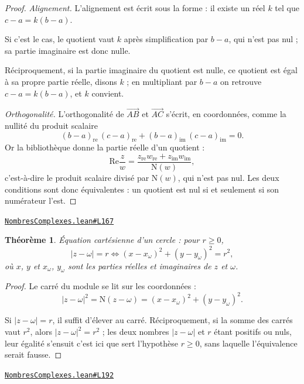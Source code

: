 \documentclass[11pt,a4paper]{article}
\theoremstyle{definition}
\theoremstyle{plain}
\newtheorem{theoreme}{Théorème}
\newcommand{\source}[2]{\par\smallskip\noindent\hfill{\footnotesize\href{#1}{\texttt{#2}}}\par\smallskip}
\begin{document}
\begin{proof}
\emph{Alignement.} L'alignement est écrit sous la forme : il existe un réel $k$ tel que
$c - a = k(b - a)$.

Si c'est le cas, le quotient vaut $k$ après simplification par $b - a$, qui n'est pas nul ;
sa partie imaginaire est donc nulle.

Réciproquement, si la partie imaginaire du quotient est nulle, ce quotient est égal à sa
propre partie réelle, disons $k$ ; en multipliant par $b - a$ on retrouve $c - a = k(b-a)$,
et $k$ convient.

\smallskip\noindent
\emph{Orthogonalité.} L'orthogonalité de $\overrightarrow{AB}$ et $\overrightarrow{AC}$
s'écrit, en coordonnées, comme la nullité du produit scalaire
\[ (b-a)_{\mathrm{re}}\,(c-a)_{\mathrm{re}} + (b-a)_{\mathrm{im}}\,(c-a)_{\mathrm{im}} = 0 . \]
Or la bibliothèque donne la partie réelle d'un quotient :
\[ \mathrm{Re}\frac{z}{w}
   = \frac{z_{\mathrm{re}} w_{\mathrm{re}} + z_{\mathrm{im}} w_{\mathrm{im}}}{\mathrm{N}(w)} , \]
c'est-à-dire le produit scalaire divisé par $\mathrm{N}(w)$, qui n'est pas nul. Les deux
conditions sont donc équivalentes : un quotient est nul si et seulement si son numérateur
l'est.
\end{proof}
\source{https://github.com/Commutator-IO/learn-lean/blob/main/courses/02-lycee/07-nombres-complexes/NombresComplexes.lean\#L167}{NombresComplexes.lean\#L167}

\begin{theoreme}
Équation cartésienne d'un cercle : pour $r \ge 0$,
\[ |z - \omega| = r \iff (x - x_\omega)^{2} + (y - y_\omega)^{2} = r^{2} , \]
où $x$, $y$ et $x_\omega$, $y_\omega$ sont les parties réelles et imaginaires de $z$ et
$\omega$.
\end{theoreme}

\begin{proof}
Le carré du module se lit sur les coordonnées :
\[ |z - \omega|^{2} = \mathrm{N}(z - \omega)
   = (x - x_\omega)^{2} + (y - y_\omega)^{2} . \]

Si $|z - \omega| = r$, il suffit d'élever au carré. Réciproquement, si la somme des carrés
vaut $r^{2}$, alors $|z-\omega|^{2} = r^{2}$ ; les deux nombres $|z - \omega|$ et $r$ étant
positifs ou nuls, leur égalité s'ensuit \textemdash{} c'est ici que sert l'hypothèse
$r \ge 0$, sans laquelle l'équivalence serait fausse.
\end{proof}
\source{https://github.com/Commutator-IO/learn-lean/blob/main/courses/02-lycee/07-nombres-complexes/NombresComplexes.lean\#L192}{NombresComplexes.lean\#L192}
\end{document}
